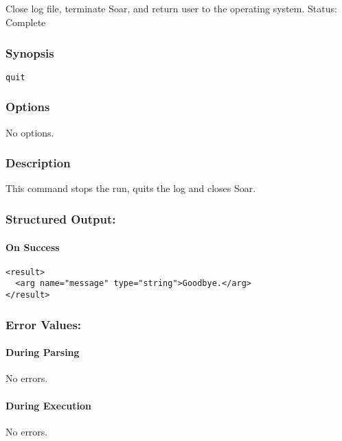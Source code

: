 \subsection{}
\label{quit}
Close log file, terminate Soar, and return user to the operating system. 
 Status: Complete
\subsubsection*{Synopsis}
\begin{verbatim}
quit
\end{verbatim}
\subsubsection*{Options}
 No options. 
\subsubsection*{Description}
 This command stops the run, quits the log and closes Soar. 
\subsubsection*{Structured Output:}
\paragraph*{On Success}
\begin{verbatim}
<result>
  <arg name="message" type="string">Goodbye.</arg>
</result>
\end{verbatim}
\subsubsection*{Error Values:}
\paragraph*{During Parsing}
 No errors. 
\paragraph*{During Execution}
 No errors. 
